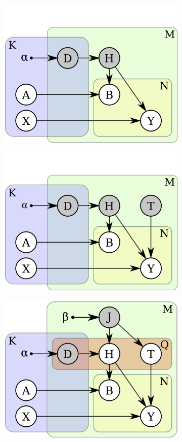 \begin{figure}[ht]
\centering
\begin{subfigure}[t]{0.48\linewidth}
	\includegraphics[width=0.8\linewidth]{fig/reg/graphicalModelNoPose.png}
	\label{fig/reg/graphicalModelNoPose}
\end{subfigure}  
\begin{subfigure}[t]{0.48\linewidth}
	\includegraphics[width=0.8\linewidth]{fig/reg/graphicalModelNoParticle.png}
	\label{fig/reg/graphicalModelNoParticle}
\end{subfigure}
\begin{subfigure}[t]{0.48\linewidth}
	\includegraphics[width=0.8\linewidth]{fig/reg/graphicalModelParticle.png}

\end{subfigure}
\end{figure}
